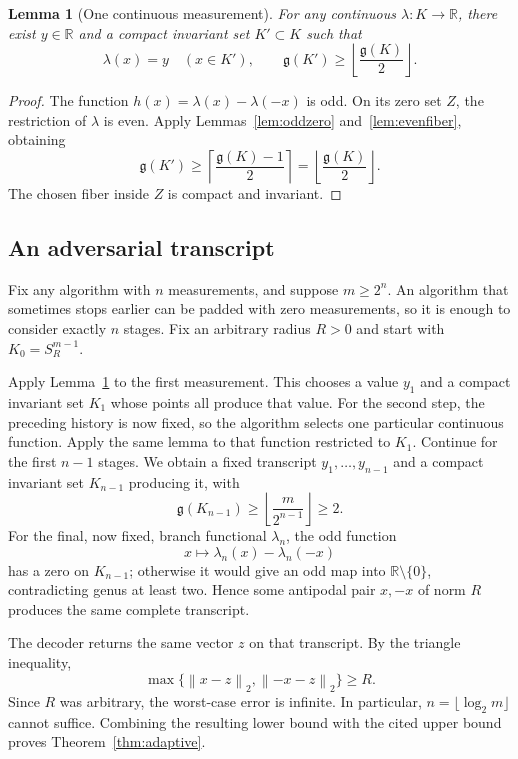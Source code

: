 \documentclass[11pt,a4paper]{article}
\newtheorem{lemma}[theorem]{Lemma}
\theoremstyle{remark}
\newcommand{\R}{\mathbb R}
\newcommand{\norm}[1]{\left\lVert #1\right\rVert}
\newcommand{\gen}{\mathfrak g}
\begin{document}
\begin{lemma}[One continuous measurement]\label{lem:onefiber}
For any continuous $\lambda:K\to\R$, there exist $y\in\R$ and a compact invariant set $K'\subset K$ such that
\[
 \lambda(x)=y\quad(x\in K'),\qquad
 \gen(K')\ge\left\lfloor\frac{\gen(K)}2\right\rfloor.
\]
\end{lemma}
\begin{proof}
The function $h(x)=\lambda(x)-\lambda(-x)$ is odd. On its zero set $Z$, the restriction of $\lambda$ is even. Apply Lemmas~\ref{lem:oddzero} and~\ref{lem:evenfiber}, obtaining
\[
 \gen(K')\ge\left\lceil\frac{\gen(K)-1}{2}\right\rceil
 =\left\lfloor\frac{\gen(K)}2\right\rfloor.
\]
The chosen fiber inside $Z$ is compact and invariant.
\end{proof}

\subsection{An adversarial transcript}

Fix any algorithm with $n$ measurements, and suppose $m\ge2^n$. An algorithm that sometimes stops earlier can be padded with zero measurements, so it is enough to consider exactly $n$ stages. Fix an arbitrary radius $R>0$ and start with $K_0=S_R^{m-1}$.

Apply Lemma~\ref{lem:onefiber} to the first measurement. This chooses a value $y_1$ and a compact invariant set $K_1$ whose points all produce that value. For the second step, the preceding history is now fixed, so the algorithm selects one particular continuous function. Apply the same lemma to that function restricted to $K_1$. Continue for the first $n-1$ stages. We obtain a fixed transcript $y_1,\ldots,y_{n-1}$ and a compact invariant set $K_{n-1}$ producing it, with
\[
 \gen(K_{n-1})\ge
 \left\lfloor\frac{m}{2^{n-1}}\right\rfloor\ge2.
\]
For the final, now fixed, branch functional $\lambda_n$, the odd function
\[
 x\longmapsto\lambda_n(x)-\lambda_n(-x)
\]
has a zero on $K_{n-1}$; otherwise it would give an odd map into $\R\setminus\{0\}$, contradicting genus at least two. Hence some antipodal pair $x,-x$ of norm $R$ produces the same complete transcript.

The decoder returns the same vector $z$ on that transcript. By the triangle inequality,
\[
 \max\{\norm{x-z}_2,\norm{-x-z}_2\}\ge R.
\]
Since $R$ was arbitrary, the worst-case error is infinite. In particular, $n=\lfloor\log_2m\rfloor$ cannot suffice. Combining the resulting lower bound with the cited upper bound proves Theorem~\ref{thm:adaptive}.
\end{document}
